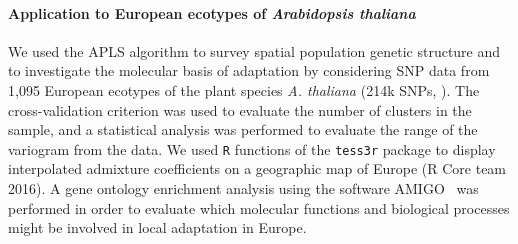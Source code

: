 \paragraph{Application to European ecotypes of {\it Arabidopsis  thaliana}} We used  the APLS algorithm to survey spatial population genetic structure and to investigate the molecular basis of adaptation  by considering SNP data from 1,095  European ecotypes of the plant species {\it A. thaliana} (214k SNPs, \cite{Horton2012}). The cross-validation criterion was used to evaluate the number of clusters in the sample, and a statistical analysis was performed to evaluate the range of the variogram from the data. We used {\tt R} functions of the {\tt tess3r} package to display interpolated admixture coefficients on a geographic map of Europe (R Core team 2016). A gene ontology enrichment analysis using the software AMIGO~\citep{Carbon2009} was performed in order to evaluate which molecular functions and biological processes might be involved in local adaptation in Europe.







